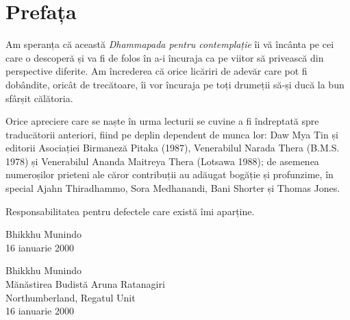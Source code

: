 

\chapter[Prefața primei ediții (2000)]{Prefața}

Am speranța că această \emph{Dhammapada pentru contemplație} îi vă încânta pe cei care o descoperă și va fi de folos în a-i încuraja ca pe viitor să privească din perspective diferite. Am încrederea că orice licăriri de adevăr care pot fi dobândite, oricât de trecătoare, îi vor încuraja pe toți drumeții să-și ducă la bun sfârșit călătoria.

Orice apreciere care se naște în urma lecturii se cuvine a fi îndreptată spre traducătorii anteriori, fiind pe deplin dependent de munca lor: Daw Mya Tin și editorii Asociației Birmaneză Pitaka (1987), Venerabilul Narada Thera (B.M.S. 1978) și Venerabilul Ananda Maitreya Thera (Lotsawa 1988); de asemenea numeroșilor prieteni ale căror contribuții au adăugat bogăție și profunzime, în special Ajahn Thiradhammo, Sora Medhanandi, Bani Shorter și Thomas Jones.

Responsabilitatea pentru defectele care există îmi aparține.

\ifpocketversion

\enlargethispage{\baselineskip}

{\raggedleft
Bhikkhu Munindo\\
16 ianuarie 2000
\par}

\else

{\raggedleft
Bhikkhu Munindo\\
Mănăstirea Budistă Aruna Ratanagiri\\
Northumberland, Regatul Unit\\
16 ianuarie 2000
\par}

\fi
